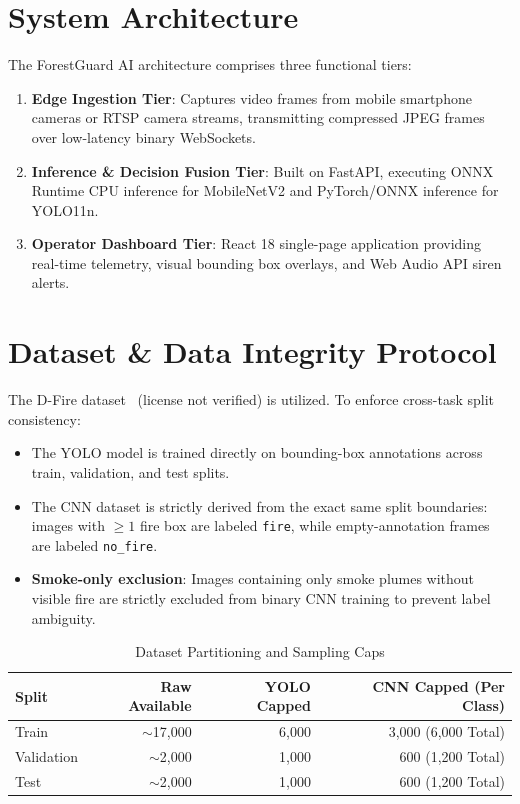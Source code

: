 \documentclass[conference]{IEEEtran}
\begin{document}
\section{System Architecture}
The ForestGuard AI architecture comprises three functional tiers:
\begin{enumerate}
    \item \textbf{Edge Ingestion Tier}: Captures video frames from mobile smartphone cameras or RTSP camera streams, transmitting compressed JPEG frames over low-latency binary WebSockets.
    \item \textbf{Inference \& Decision Fusion Tier}: Built on FastAPI, executing ONNX Runtime CPU inference for MobileNetV2 and PyTorch/ONNX inference for YOLO11n.
    \item \textbf{Operator Dashboard Tier}: React 18 single-page application providing real-time telemetry, visual bounding box overlays, and Web Audio API siren alerts.
\end{enumerate}

\section{Dataset \& Data Integrity Protocol}
The D-Fire dataset~\cite{devenancio2022dfire} (license not verified) is utilized. To enforce cross-task split consistency:
\begin{itemize}
    \item The YOLO model is trained directly on bounding-box annotations across train, validation, and test splits.
    \item The CNN dataset is strictly derived from the exact same split boundaries: images with $\ge 1$ fire box are labeled \texttt{fire}, while empty-annotation frames are labeled \texttt{no\_fire}.
    \item \textbf{Smoke-only exclusion}: Images containing only smoke plumes without visible fire are strictly excluded from binary CNN training to prevent label ambiguity.
\end{itemize}

\begin{table}[htbp]
\caption{Dataset Partitioning and Sampling Caps}
\begin{center}
\begin{tabular}{lrrr}
\toprule
\textbf{Split} & \textbf{Raw Available} & \textbf{YOLO Capped} & \textbf{CNN Capped (Per Class)} \\
\midrule
Train & $\sim$17,000 & 6,000 & 3,000 (6,000 Total) \\
Validation & $\sim$2,000 & 1,000 & 600 (1,200 Total) \\
Test & $\sim$2,000 & 1,000 & 600 (1,200 Total) \\
\bottomrule
\end{tabular}
\label{tab:dataset}
\end{center}
\end{table}
\end{document}
